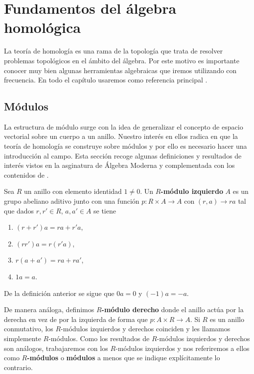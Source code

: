 
\chapter{Fundamentos del álgebra homológica}
La teoría de homología es una rama de la topología que trata de resolver
problemas topológicos en el ámbito del álgebra. Por este motivo es importante conocer
muy bien algunas herramientas algebraicas que iremos utilizando con frecuencia.
En todo el capítulo usaremos como referencia principal
\cite{maclane2012homology}.

\section{Módulos}

La estructura de módulo surge con la idea de generalizar el concepto de espacio vectorial
sobre un cuerpo a un anillo. Nuestro interés en ellos radica en que la teoría de
homología se construye sobre módulos y por ello es necesario hacer una
introducción al campo. Esta sección recoge algunas definiciones y resultados de interés
vistos en la asginatura de Álgebra Moderna y complementada con los contenidos de
\cite{dummit2004abstract}.

\begin{definicion}
	Sea \(R\) un anillo con elemento identidad \(1 \neq 0\). Un \textbf{\(R\)-módulo
	izquierdo} \(A\) es un grupo abeliano aditivo junto con una función \(p: R \times
	A \rightarrow A\) con \((r, a) \to ra\) tal que dados \(r,r' \in R\), \(a,a' \in A\)
	se tiene
	\begin{enumerate}
		\item \((r+r') a = r a + r' a\),
		\item \((rr') a = r (r' a)\),
		\item \(r(a+a') = ra + ra'\),
		\item \(1a = a\).
	\end{enumerate}
\end{definicion}

De la definición anterior se sigue que \(0a = 0\) y \((-1)a = -a\).

De manera análoga, definimos \textbf{\(R\)-módulo derecho} donde el anillo actúa
por la derecha en vez de por la izquierda de forma que
\(p: A \times R \rightarrow A\). Si \(R\) es un anillo conmutativo, los \(R\)-módulos
izquierdos y derechos coinciden y les llamamos simplemente \(R\)-módulos. Como los
resultados de \(R\)-módulos izquierdos y derechos son análogos, trabajaremos con
los \(R\)-módulos izquierdos y nos referiremos a ellos como \textbf{\(R\)-módulos} o
\textbf{módulos} a menos que se indique explícitamente lo contrario.

